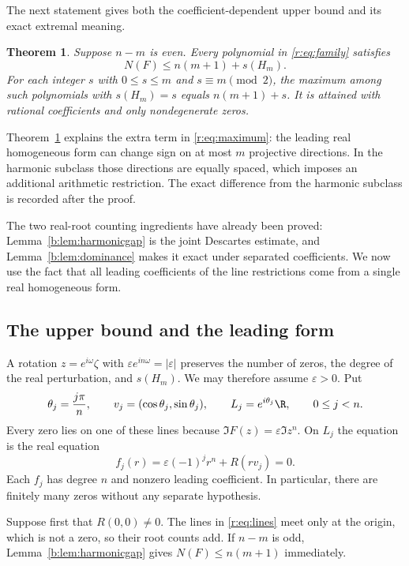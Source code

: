 \documentclass[UTF8,11pt]{ctexart}
\newtheorem{thm}{Theorem}[section]
\theoremstyle{definition}
\numberwithin{equation}{section}
\newcommand{\eps}{\varepsilon}\newcommand{\ep}{\varepsilon}
\begin{document}
The next statement gives both the coefficient-dependent upper bound
and its exact extremal meaning.
\begin{thm}\label{r:thm:leading}
Suppose $n-m$ is even. Every polynomial in \eqref{r:eq:family} satisfies
\begin{equation}\label{r:eq:leading}
 N(F)\le n(m+1)+s(H_m).
\end{equation}
For each integer $s$ with $0\le s\le m$ and $s\equiv m\pmod2$, the
maximum among such polynomials with $s(H_m)=s$ equals $n(m+1)+s$.
It is attained with rational coefficients and only nondegenerate zeros.
\end{thm}

Theorem~\ref{r:thm:leading} explains the extra term in
\eqref{r:eq:maximum}: the leading real homogeneous form can change sign
on at most $m$ projective directions. In the harmonic subclass those
directions are equally spaced, which imposes an additional arithmetic
restriction. The exact difference from the harmonic subclass is recorded after the proof.

The two real-root counting ingredients have already been proved:
Lemma~\ref{b:lem:harmonicgap} is the joint Descartes estimate, and
Lemma~\ref{b:lem:dominance} makes it exact under separated coefficients.
We now use the fact that all leading coefficients of the line restrictions
come from a single real homogeneous form.
\subsection{The upper bound and the leading form}\label{r:sec:upper}

A rotation $z=e^{i\omega}\zeta$ with
$\eps e^{in\omega}=|\eps|$ preserves the number of zeros, the degree
of the real perturbation, and $s(H_m)$. We may therefore assume
$\eps>0$. Put
\begin{equation}\label{r:eq:lines}
 \theta_j=\frac{j\pi}{n},\qquad
 v_j=(\cos\theta_j,\sin\theta_j),\qquad
 L_j=e^{i\theta_j}\R,\qquad 0\le j<n.
\end{equation}
Every zero lies on one of these lines because
$\Im F(z)=\eps\Im z^n$. On $L_j$ the equation is the real equation
\begin{equation}\label{r:eq:restrictions}
 f_j(r)=\eps(-1)^j r^n+R(rv_j)=0.
\end{equation}
Each $f_j$ has degree $n$ and nonzero leading coefficient. In particular,
there are finitely many zeros without any separate hypothesis.

Suppose first that $R(0,0)\ne0$. The lines in \eqref{r:eq:lines} meet
only at the origin, which is not a zero, so their root counts add.
If $n-m$ is odd, Lemma~\ref{b:lem:harmonicgap} gives
$N(F)\le n(m+1)$ immediately.
\end{document}
